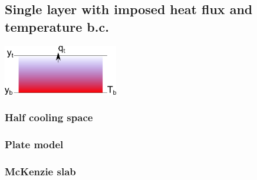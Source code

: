 

 
\subsection{Single layer with imposed heat flux and temperature b.c. }

\begin{center}
\includegraphics[width=5cm]{images/initial_temperature/tempcond3.png}
\end{center}



\subsubsection{Half cooling space}

\subsubsection{Plate model}

\subsubsection{McKenzie slab}










